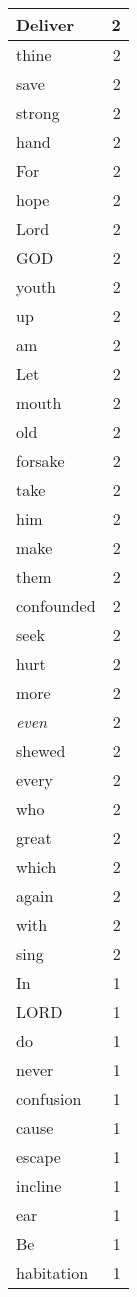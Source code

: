 \begin{center}
\begin{longtable}{l|r}
Deliver & 2 \\ \hline
thine & 2 \\ \hline
save & 2 \\ \hline
strong & 2 \\ \hline
hand & 2 \\ \hline
For & 2 \\ \hline
hope & 2 \\ \hline
Lord & 2 \\ \hline
GOD & 2 \\ \hline
youth & 2 \\ \hline
up & 2 \\ \hline
am & 2 \\ \hline
Let & 2 \\ \hline
mouth & 2 \\ \hline
old & 2 \\ \hline
forsake & 2 \\ \hline
take & 2 \\ \hline
him & 2 \\ \hline
make & 2 \\ \hline
them & 2 \\ \hline
confounded & 2 \\ \hline
seek & 2 \\ \hline
hurt & 2 \\ \hline
more & 2 \\ \hline
\emph{even} & 2 \\ \hline
shewed & 2 \\ \hline
every & 2 \\ \hline
who & 2 \\ \hline
great & 2 \\ \hline
which & 2 \\ \hline
again & 2 \\ \hline
with & 2 \\ \hline
sing & 2 \\ \hline
In & 1 \\ \hline
LORD & 1 \\ \hline
do & 1 \\ \hline
never & 1 \\ \hline
confusion & 1 \\ \hline
cause & 1 \\ \hline
escape & 1 \\ \hline
incline & 1 \\ \hline
ear & 1 \\ \hline
Be & 1 \\ \hline
habitation & 1 \\ \hline

\end{longtable}
\end{center}
